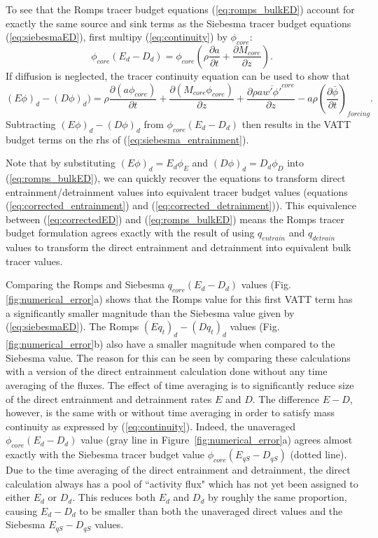 \documentclass[12pt]{article}
\begin{document}
To see that the Romps tracer budget equations (\ref{eq:romps_bulkED}) account for exactly the same
source and sink terms as  the Siebesma 
tracer budget equations (\ref{eq:siebesmaED}),  first multipy  (\ref{eq:continuity})
by $\phi_{core}$:
\begin{equation}
    \phi_{core}(E_d - D_d) =
    \phi_{core} \left(\rho \frac{\partial a}{\partial t}
                    + \frac{\partial M_{core}}{\partial z}\right).
\end{equation}
If diffusion is neglected, the tracer continuity equation can be 
used to show that
\begin{equation}
    (E\phi)_d - (D\phi)_d) = 
     \rho \frac{\partial (a \phi_{core})}{\partial t}
   + \frac{\partial (M_{core} \phi_{core})}{\partial z}
   + \frac{\partial \rho a \overline{w' \phi'}^{core}}{\partial z}
   - a \rho \left(\frac{\partial \bar{\phi}}{\partial t}\right)_{forcing}.
\end{equation}
Subtracting $(E\phi)_d - (D\phi)_d$ from $\phi_{core}(E_d - D_d)$ then 
results in the VATT budget terms on the rhs of (\ref{eq:siebesma_entrainment}).  

Note that by substituting $(E \phi)_d = E_d \phi_E$ and 
$(D\phi)_d = D_d \phi_D$ into (\ref{eq:romps_bulkED}), we can quickly recover the 
equations to transform direct entrainment/detrainment values into 
equivalent tracer budget values (equations (\ref{eq:corrected_entrainment}) 
and (\ref{eq:corrected_detrainment})).  This equivalence between 
(\ref{eq:correctedED}) and (\ref{eq:romps_bulkED})
means the Romps tracer budget formulation agrees exactly with the result of 
using $q_{entrain}$ and $q_{detrain}$ values to transform the direct 
entrainment and detrainment into equivalent bulk tracer values.  

Comparing the Romps and Siebesma $q_{core}(E_d - D_d)$ values
(Fig. \ref{fig:numerical_error}a) shows that the Romps value for this
first VATT term has a significantly smaller magnitude than the
Siebesma value given by (\ref{eq:siebesmaED}).  
The Romps $(Eq_t)_d - (Dq_t)_d$ values
(Fig. \ref{fig:numerical_error}b) also have a smaller magnitude when
compared to the Siebesma value.  The reason for this can be seen by
comparing these calculations with a version of the direct entrainment
calculation done without any time averaging of the fluxes.  The effect
of time averaging is to significantly reduce size of the direct
entrainment and detrainment rates $E$ and $D$.  The difference $E-D$,
however, is the same with or without time averaging in order to
satisfy mass continuity as expressed by (\ref{eq:continuity}).
Indeed, the unaveraged $\phi_{core}(E_d - D_d)$ value (gray line in
Figure~\ref{fig:numerical_error}a) agrees almost exactly with the
Siebesma tracer budget value $\phi_{core}(E_{qS} - D_{qS})$ (dotted
line).  Due to the time averaging of the direct entrainment and
detrainment, the direct calculation always has a pool of ``activity
flux" which has not yet been assigned to either $E_d$ or $D_d$.  This
reduces both $E_d$ and $D_d$ by roughly the same proportion, causing
$E_d-D_d$ to be smaller than both the unaveraged direct values and the
Siebesma $E_{qS}-D_{qS}$ values.
\end{document}
